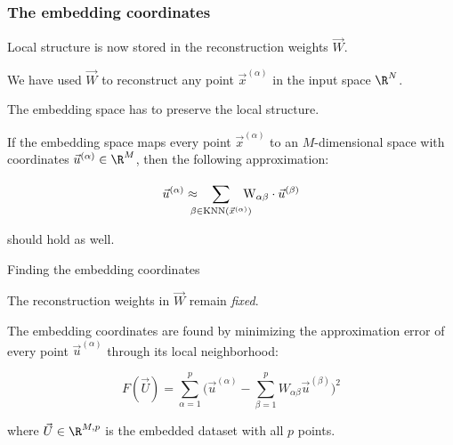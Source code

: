 \subsubsection{The embedding coordinates}

\begin{frame}{\subsubsecname}

Local structure is now stored in the reconstruction weights $\vec W$.

We have used $\vec W$ to reconstruct any point $\vec x^{(\alpha)}$ in the input space $\R^N$.

The embedding space has to preserve the local structure.

If the embedding space maps every point $\vec x^{(\alpha)}$ to an $M$-dimensional space with 
coordinates $\vec u^{(\alpha)} \in \R^M$, then the following approximation:

\begin{equation}\vec{u}^{(\alpha)} \approx \hspace{-3mm} \sum_{\beta \in \operatorname{KNN}(\vec{x}^{(\alpha)})}^{} \hspace{-3mm} \mathrm{W}_{\alpha \beta} \cdot \vec{u}^{(\beta)}
\end{equation}

should hold as well.

\end{frame}

\begin{frame}{Finding the embedding coordinates}

The reconstruction weights in $\vec W$ remain \emph{fixed}.

The embedding coordinates are found by minimizing the approximation error of every point $\vec u^{(\alpha)}$ through its local neighborhood:

\begin{equation}
	F(\vec U) =
    \sum_{\alpha=1}^{p} 
	\bigg(  \vec{u}^{(\alpha)}  - \sum_{\beta=1}^{p} W_{\alpha \beta} \vec{u}^{(\beta)}
	\bigg) ^ 2
\end{equation}

where $\vec U \in \R^{M,p}$ is the embedded dataset with all $p$ points.

\end{frame}


